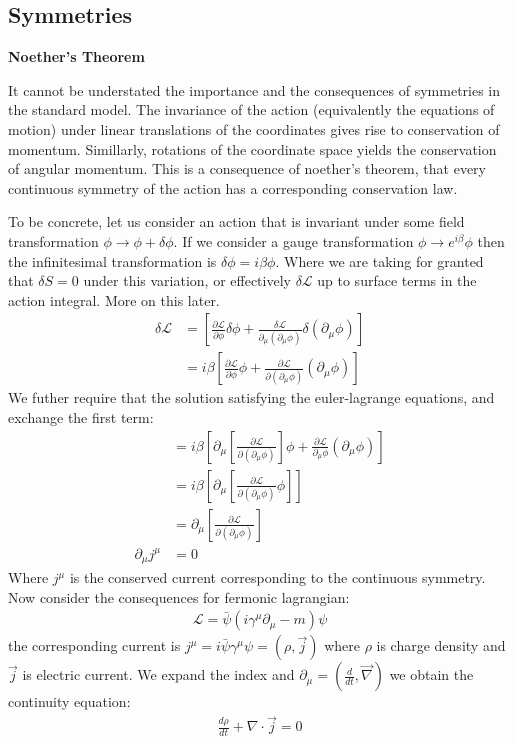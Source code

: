 \subsection{Symmetries}

\textbf{Noether's Theorem}

It cannot be understated the importance and the consequences of symmetries in the standard model. The
invariance of the action (equivalently the equations of motion) under linear translations of the  coordinates
gives rise to conservation of momentum. Simillarly,  rotations of the coordinate space
yields the conservation of angular momentum. This is a consequence of noether's theorem, that every 
continuous symmetry of the action has a corresponding conservation law. 

To be concrete, let us consider an action that is invariant under some field transformation
 $\phi \rightarrow \phi + \delta \phi$. If we consider a gauge transformation $\phi \rightarrow e^{i \beta}\phi$  
then the infinitesimal transformation is $\delta \phi = i \beta \phi$. Where we are taking for granted that $\delta S =0$ under
this variation, or effectively $\delta \mathcal{L}$ up to surface terms in the action integral. More on this later.
\begin{align*}
\delta \mathcal{L} &=  \left [ \frac{\partial \mathcal{L}}{\partial \phi} \delta \phi  + \frac{\delta \mathcal{L}}{\partial_\mu (\partial_\mu \phi)} \delta(\partial_\mu \phi) \right]\\
&= i\beta \left [ \frac{\partial \mathcal{L}}{\partial \phi}  \phi  + \frac{\partial \mathcal{L}}{\partial (\partial_\mu\phi)} (\partial_\mu \phi) \right]
\end{align*}
We futher require that the solution satisfying the euler-lagrange equations, and exchange the first term:
\begin{align*}
&= i\beta \left [ \partial_\mu\left [ \frac{\partial \mathcal{L}}{\partial(\partial_\mu \phi)} \right ]  \phi  + \frac{\partial \mathcal{L}}{\partial_\mu \phi} (\partial_\mu \phi) \right]\\ 
&= i\beta \left [ \partial_\mu  \left [  \frac{\partial \mathcal{L}}{\partial(\partial_\mu \phi)}   \phi  \right ] \right ]\\ 
&= \partial_\mu \left [ \frac{\partial \mathcal{L}}{\partial (\partial_\mu \phi) }\right ] \\
\partial_\mu j^\mu &= 0 
\end{align*}
Where $j^\mu$ is the conserved current corresponding to the continuous symmetry. Now consider the consequences for fermonic lagrangian:
\begin{align*}
\mathcal{L} = \bar{\psi}(i \gamma^\mu \partial_\mu -m)\psi
\end{align*}
the corresponding current is $j^\mu = i\bar \psi \gamma^\mu \psi = (\rho, \vec j)$ where $\rho$ is charge density and $\vec j$ is electric current.
We expand the index and $\partial_\mu = (\frac{d}{dt}, \vec \nabla)$ we obtain the continuity equation:
\begin{align*}
\frac{d\rho}{dt} + \nabla \cdot \vec j = 0
\end{align*}

